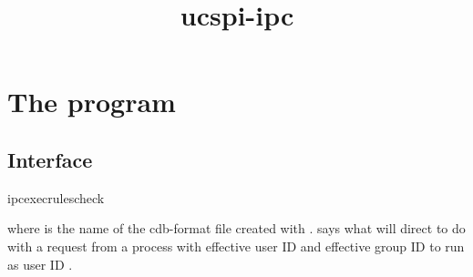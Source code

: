\documentclass{book}
\title{ucspi-ipc}
\begin{document}
\section{The  program}

\subsection{Interface}
\begin{code}%
  ipcexecrulescheck 
\end{code}
where  is the name of the cdb-format file created with
.   says what  will
direct  to do with a request from a process with effective
user ID  and effective group ID
 to run  as user ID
.
\end{document}
